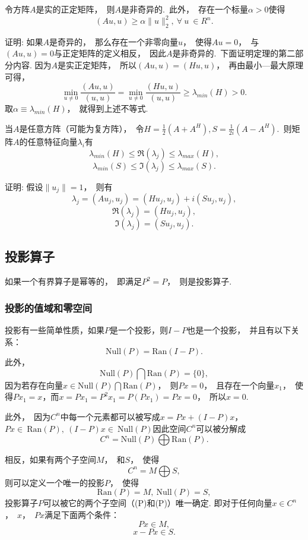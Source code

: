 \documentclass{article}
\newcommand{\Null}{\text{Null}}
\newcommand{\Ran}{\text{Ran}}
\begin{document}

\begin{thm}
令方阵$A$是实的正定矩阵，~则$A$是非奇异的.~此外，~存在一个标量$\alpha >0$使得
$$(Au,u)\geqslant \alpha \parallel u \parallel _2^2,~\forall ~u~\in R^n.$$
\end{thm}
证明:
如果$A$是奇异的，~那么存在一个非零向量$u$，~使得$Au=0$，~与$(Au,u)=0$与正定矩阵的定义相反，~因此$A$是非奇异的.~下面证明定理的第二部分内容.
因为$A$是实正定矩阵，~所以$(Au,u)=(Hu,u)$，~再由最小—最大原理可得，
$$\min \limits_{u\neq 0}\frac{(Au,u)}{(u,u)}=\min \limits_{u\neq 0}\frac{(Hu,u)}{(u,u)}\geqslant \lambda_{min}(H)>0.$$
取$\alpha \equiv  \lambda_{min}(H)$，~就得到上述不等式.


\begin{thm}
当$A$是任意方阵（可能为复方阵），~令$H=\frac{1}{2}(A+A^H),S=\frac{1}{2i}(A-A^H)$.~则矩阵$A$的任意特征向量$\lambda _i$有
$$\lambda_{min}(H)\leqslant \Re (\lambda _j)\leqslant \lambda_{max}(H),$$
$$\lambda_{min}(S)\leqslant \Im (\lambda _j)\leqslant \lambda_{max}(S).$$
\end{thm}
证明:
假设$\parallel u_j\parallel=1$，~则有
$$\lambda_{j}=(Au_j,u_j)=(Hu_j,u_j)+i(Su_j,u_j),$$
$$\Re (\lambda _j)=(Hu_j,u_j),$$
$$\Im (\lambda _j)=(Su_j,u_j).$$


\subsection{投影算子}
如果一个有界算子是幂等的，~即满足$P^2=P$，~则是投影算子.

\subsubsection{投影的值域和零空间}
投影有一些简单性质，如果$P$是一个投影，则$I-P$也是一个投影，~并且有以下关系：
$$\Null(P)=\Ran(I-P).$$
此外，
$$\Null(P)\bigcap \Ran(P)=\lbrace 0\rbrace,$$
因为若存在向量$x\in \Null(P)\bigcap \Ran(P)$，~则$Px=0$，~且存在一个向量$x_1$，~使得$Px_1=x$，而$x=Px_1=P^2x_1=P(Px_1)=Px=0$，~所以$x=0$.

此外，~因为$C^n$中每一个元素都可以被写成$x=Px+(I-P)x$，~$Px\in~\Ran(P),~(I-P)x\in~\Null(P)$因此空间$C^n$可以被分解成
$$C^n=\Null(P)\bigoplus \Ran(P).$$

相反，如果有两个子空间$M$，~和$S$，~使得
$$C^n=M\bigoplus S,$$
则可以定义一个唯一的投影$P$，~使得
$$\Ran(P)=M,~\Null(P)=S,$$
投影算子$P$可以被它的两个子空间（\Ran(P)和\Null(P)）唯一确定.
即对于任何向量$x\in C^n$，~$x$，~$Px$满足下面两个条件：
$$Px\in M,$$
$$x-Px\in S.$$
\end{document}
